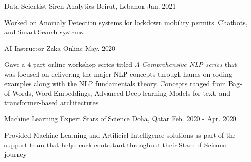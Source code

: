 

\begin{cventries}

  \cventry
    {Data Scientist} %
    {Siren Analytics} %
    {Beirut, Lebanon} %
    {Jan. 2021} %
    {
      \begin{cvitems} %
        \item {Worked on Anomaly Detection systems for lockdown mobility permits, Chatbots, and Smart Search systems.}
      \end{cvitems}
    }
  \cventry
    {AI Instructor} %
    {Zaka} %
    {Online} %
    {May. 2020} %
    {
      \begin{cvitems} %
        \item {Gave a 4-part online workshop series titled \textit{A Comprehensive NLP series} that was focused on delivering the major NLP concepts through hands-on coding examples along with the NLP fundamentals theory. Concepts ranged from Bag-of-Words, Word Embeddings, Advanced Deep-learning Models for text, and transformer-based architectures}
      \end{cvitems}
    }
  \cventry
    {Machine Learning Expert} %
    {Stars of Science} %
    {Doha, Qatar} %
    {Feb. 2020 - Apr. 2020} %
    {
      \begin{cvitems} %
        \item {Provided Machine Learning and Artificial Intelligence solutions as part of the support team that helps each contestant throughout their Stars of Science journey}
      \end{cvitems}
    }
\newline


\end{cventries}
